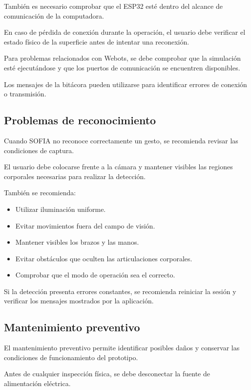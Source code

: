 \documentclass[letterpaper,journal]{IEEEtran}
\begin{document}
También es necesario comprobar que
el ESP32 esté dentro del alcance
de comunicación de la computadora.

En caso de pérdida de conexión durante
la operación, el usuario debe verificar
el estado físico de la superficie
antes de intentar una reconexión.

Para problemas relacionados con Webots,
se debe comprobar que la simulación
esté ejecutándose y que los puertos
de comunicación se encuentren disponibles.

Los mensajes de la bitácora pueden
utilizarse para identificar errores
de conexión o transmisión.

\subsection{Problemas de reconocimiento}

Cuando SOFIA no reconoce correctamente
un gesto, se recomienda revisar
las condiciones de captura.

El usuario debe colocarse frente
a la cámara y mantener visibles
las regiones corporales necesarias
para realizar la detección.

También se recomienda:

\begin{itemize}
    \item Utilizar iluminación uniforme.
    \item Evitar movimientos fuera
    del campo de visión.
    \item Mantener visibles los brazos
    y las manos.
    \item Evitar obstáculos que
    oculten las articulaciones
    corporales.
    \item Comprobar que el modo
    de operación sea el correcto.
\end{itemize}

Si la detección presenta errores
constantes, se recomienda reiniciar
la sesión y verificar los mensajes
mostrados por la aplicación.

\subsection{Mantenimiento preventivo}

El mantenimiento preventivo permite
identificar posibles daños y conservar
las condiciones de funcionamiento
del prototipo.

Antes de cualquier inspección física,
se debe desconectar la fuente de
alimentación eléctrica.
\end{document}
